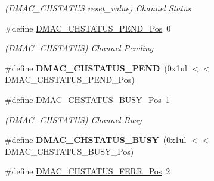 \begin{DoxyCompactItemize}
\begin{DoxyCompactList}\small\item\em (D\+M\+A\+C\+\_\+\+C\+H\+S\+T\+A\+T\+U\+S reset\+\_\+value) Channel Status \end{DoxyCompactList}\item 
\hypertarget{group___s_a_m_l21___d_m_a_c_ga75fed352937bb04158598ff9a898eb27}{}\#define \hyperlink{group___s_a_m_l21___d_m_a_c_ga75fed352937bb04158598ff9a898eb27}{D\+M\+A\+C\+\_\+\+C\+H\+S\+T\+A\+T\+U\+S\+\_\+\+P\+E\+N\+D\+\_\+\+Pos}~0\label{group___s_a_m_l21___d_m_a_c_ga75fed352937bb04158598ff9a898eb27}

\begin{DoxyCompactList}\small\item\em (D\+M\+A\+C\+\_\+\+C\+H\+S\+T\+A\+T\+U\+S) Channel Pending \end{DoxyCompactList}\item 
\hypertarget{group___s_a_m_l21___d_m_a_c_ga988654c61c91e40a430b69f52fb21348}{}\#define {\bfseries D\+M\+A\+C\+\_\+\+C\+H\+S\+T\+A\+T\+U\+S\+\_\+\+P\+E\+N\+D}~(0x1ul $<$$<$ D\+M\+A\+C\+\_\+\+C\+H\+S\+T\+A\+T\+U\+S\+\_\+\+P\+E\+N\+D\+\_\+\+Pos)\label{group___s_a_m_l21___d_m_a_c_ga988654c61c91e40a430b69f52fb21348}

\item 
\hypertarget{group___s_a_m_l21___d_m_a_c_gab4da5ea102a833a9525221616de22850}{}\#define \hyperlink{group___s_a_m_l21___d_m_a_c_gab4da5ea102a833a9525221616de22850}{D\+M\+A\+C\+\_\+\+C\+H\+S\+T\+A\+T\+U\+S\+\_\+\+B\+U\+S\+Y\+\_\+\+Pos}~1\label{group___s_a_m_l21___d_m_a_c_gab4da5ea102a833a9525221616de22850}

\begin{DoxyCompactList}\small\item\em (D\+M\+A\+C\+\_\+\+C\+H\+S\+T\+A\+T\+U\+S) Channel Busy \end{DoxyCompactList}\item 
\hypertarget{group___s_a_m_l21___d_m_a_c_ga17427c2c6450dcfe7576d0970e740d0b}{}\#define {\bfseries D\+M\+A\+C\+\_\+\+C\+H\+S\+T\+A\+T\+U\+S\+\_\+\+B\+U\+S\+Y}~(0x1ul $<$$<$ D\+M\+A\+C\+\_\+\+C\+H\+S\+T\+A\+T\+U\+S\+\_\+\+B\+U\+S\+Y\+\_\+\+Pos)\label{group___s_a_m_l21___d_m_a_c_ga17427c2c6450dcfe7576d0970e740d0b}

\item 
\hypertarget{group___s_a_m_l21___d_m_a_c_gaa4f8c2395f4ea053b20afd513fd4cd3f}{}\#define \hyperlink{group___s_a_m_l21___d_m_a_c_gaa4f8c2395f4ea053b20afd513fd4cd3f}{D\+M\+A\+C\+\_\+\+C\+H\+S\+T\+A\+T\+U\+S\+\_\+\+F\+E\+R\+R\+\_\+\+Pos}~2\label{group___s_a_m_l21___d_m_a_c_gaa4f8c2395f4ea053b20afd513fd4cd3f}


\end{DoxyCompactItemize}
